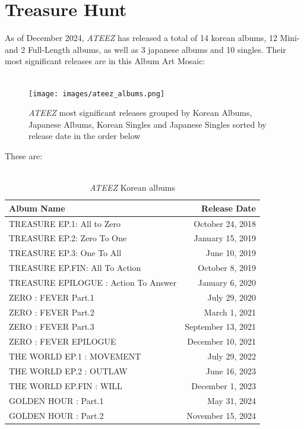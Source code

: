 \documentclass[a4paper,12pt]{article}
\begin{document}

\newpage
\section{Treasure Hunt}
As of December 2024, \textit{ATEEZ} has released a total of 14 korean albums, 12 Mini- and 2 Full-Length albums, as well as 3 japanese albums and 10 singles. Their most significant releases are in this Album Art Mosaic:\\ \\

\begin{figure}[h]
    \centering  %
    \texttt{[image: images/ateez\_albums.png]}
    \caption{\textit{ATEEZ} most significant releases grouped by Korean Albums, Japanese Albums, Korean Singles and Japanese Singles sorted by release date in the order below}
    \label{fig:ateezgroup}
\end{figure}

These are:\\\\

\begin{table}[H]
\begin{tabularx}{\textwidth}{|X|r|}
    \hline
    Album Name & Release Date\\
    \hline
    TREASURE EP.1: All to Zero & October 24, 2018\\
    \hline
    TREASURE EP.2: Zero To One &  January 15, 2019\\
    \hline
    TREASURE EP.3: One To All &  June 10, 2019\\
    \hline
    TREASURE EP.FIN: All To Action & October 8, 2019\\
    \hline
    TREASURE EPILOGUE : Action To Answer & January 6, 2020\\
    \hline
    ZERO : FEVER Part.1 & July 29, 2020\\
    \hline
    ZERO : FEVER Part.2 & March 1, 2021\\
    \hline
    ZERO : FEVER Part.3 & September 13, 2021\\
    \hline
    ZERO : FEVER EPILOGUE & December 10, 2021\\
    \hline
    THE WORLD EP.1 : MOVEMENT &  July 29, 2022\\
    \hline
    THE WORLD EP.2 : OUTLAW & June 16, 2023\\
    \hline
    THE WORLD EP.FIN : WILL & December 1, 2023\\
    \hline
    GOLDEN HOUR : Part.1 & May 31, 2024\\
    \hline
    GOLDEN HOUR : Part.2 & November 15, 2024\\
    \hline
\end{tabularx}
\caption{\textit{ATEEZ} Korean albums}
\end{table}
\end{document}
